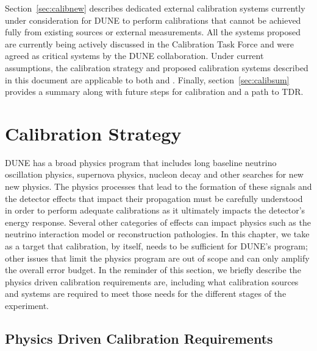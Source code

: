 Section~\ref{sec:calibnew} describes dedicated external calibration systems currently under consideration for DUNE to perform calibrations that cannot be achieved fully from existing sources or external measurements. All the systems proposed are currently being actively discussed in the Calibration Task Force and were agreed as critical systems by the DUNE collaboration. Under current assumptions, the calibration strategy and proposed calibration systems described in this document are applicable to both  and . %
Finally, section~\ref{sec:calibsum} provides a summary along with future steps for calibration and a path to TDR. 

\section{Calibration Strategy}
\label{sec:calibstrat} %
DUNE has a broad physics program that includes long baseline neutrino oscillation physics, supernova physics, nucleon decay and other searches for new new physics. The physics processes that lead to the formation of these signals and the detector effects that impact their propagation must be carefully understood in order to perform adequate calibrations as it ultimately impacts the detector's energy response. Several other categories of effects can impact physics such as the neutrino interaction model or reconstruction pathologies. In this chapter, we take as a target that calibration, by itself, needs to be sufficient for DUNE's program; other issues that limit the physics program are out of scope and can only amplify the overall error budget. In the reminder of this section, we briefly describe the physics driven calibration requirements are, including what calibration sources and systems are required to meet those needs for the different stages of the experiment.

\subsection{Physics Driven Calibration Requirements}

